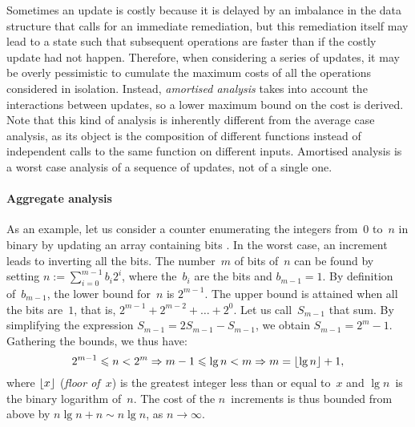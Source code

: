 \label{par:amortised_cost}

Sometimes an update is costly because it is delayed by an imbalance in
the data structure that calls for an immediate remediation, but this
remediation itself may lead to a state such that subsequent operations
are faster than if the costly update had not happen. Therefore, when
considering a series of updates, it may be overly pessimistic to
cumulate the maximum costs of all the operations considered in
isolation. Instead, \emph{amortised
  analysis} \citep{Okasaki_1998a} \citep[\S{}17]{CLRS_2009} takes into
account the interactions between updates, so a lower maximum bound on
the cost is derived. Note that this kind of analysis is inherently
different from the average case analysis, as its object is the
composition of different functions instead of independent calls to the
same function on different inputs. Amortised analysis is a worst case
analysis of a sequence of updates, not of a single one.


\paragraph{Aggregate analysis}
\label{par:aggregate}

As an example, let us consider a counter enumerating the integers
from~\(0\) to~\(n\) in binary by updating an array containing bits
\cite[\S{}17.1]{CLRS_2009}. In the worst case, an increment leads to
inverting all the bits. The number~\(m\) of bits of~\(n\) can be found
by setting \(n := \sum_{i=0}^{m-1}{b_i2^i}\), where the~\(b_i\) are
the bits and \(b_{m-1}=1\). By definition of~\(b_{m-1}\), the lower
bound for~\(n\) is \(2^{m-1}\). The upper bound is attained when all
the bits are~\(1\), that is, \(2^{m-1} + 2^{m-2} + \ldots +
2^0\). Let us call~\(S_{m-1}\) that sum. By simplifying the
  expression \(S_{m-1} = 2 S_{m-1} - S_{m-1}\), we obtain \(S_{m-1} =
  2^m - 1\). Gathering the bounds, we thus have:
\begin{equation}
2^{m-1} \leqslant n < 2^m \Rightarrow m - 1 \leqslant \lg n
< m \Rightarrow m = \lfloor{\lg n}\rfloor + 1,
\label{eq:num_of_bits}
\end{equation}
where \(\lfloor{x}\rfloor\) (\textsl{floor
  of~\(x\)}) is the greatest integer less than or equal to~\(x\) and
\(\lg n\)~is the binary logarithm of~\(n\). The cost of the
\(n\)~increments is thus bounded from above by \(n\lg n + n \sim n\lg
n\), as \(n \rightarrow \infty\).

